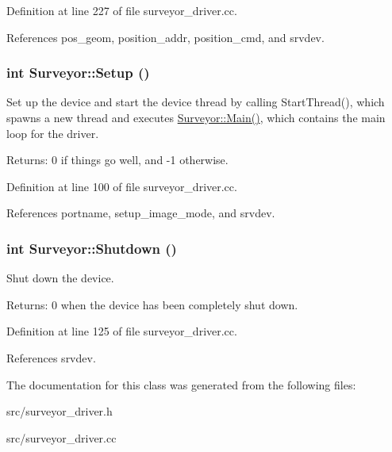 Definition at line 227 of file surveyor\_\-driver.cc.

References pos\_\-geom, position\_\-addr, position\_\-cmd, and srvdev.\hypertarget{classSurveyor_c127d6028c08790fe79902b1b8359468}{
\subsubsection[{Setup}]{\setlength{\rightskip}{0pt plus 5cm}int Surveyor::Setup ()}}
\label{classSurveyor_c127d6028c08790fe79902b1b8359468}


Set up the device and start the device thread by calling StartThread(), which spawns a new thread and executes \hyperlink{classSurveyor_e6ae9ea8d60a2038b6dacdab7ccee458}{Surveyor::Main()}, which contains the main loop for the driver. 

\begin{Desc}
\item[Returns:]0 if things go well, and -1 otherwise. \end{Desc}


Definition at line 100 of file surveyor\_\-driver.cc.

References portname, setup\_\-image\_\-mode, and srvdev.\hypertarget{classSurveyor_cfe0180d05f0a34474a75cdfd87b1a81}{
\subsubsection[{Shutdown}]{\setlength{\rightskip}{0pt plus 5cm}int Surveyor::Shutdown ()}}
\label{classSurveyor_cfe0180d05f0a34474a75cdfd87b1a81}


Shut down the device. 

\begin{Desc}
\item[Returns:]0 when the device has been completely shut down. \end{Desc}


Definition at line 125 of file surveyor\_\-driver.cc.

References srvdev.

The documentation for this class was generated from the following files:\begin{CompactItemize}
\item 
src/surveyor\_\-driver.h\item 
src/surveyor\_\-driver.cc\end{CompactItemize}
